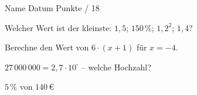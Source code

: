 \documentclass[11pt]{article}
\begin{document}
{}
\par\vspace{2pt}\noindent Name \underline{\hspace{7cm}}\hfill Datum \underline{\hspace{3cm}}\hfill Punkte \underline{\hspace{1.2cm}} / 18\par\vspace{6pt}
\small

\noindent\begin{minipage}[t]{0.485\linewidth}\raggedright
\begin{aufgabe}{Welcher Wert ist der kleinste: $1{,}5$; $150\,\%$; $1{,}2^2$; $1{,}4$? \leerfeld}
\end{aufgabe}
\end{minipage}\hfill\begin{minipage}[t]{0.485\linewidth}\raggedright
\begin{aufgabe}{Berechne den Wert von $6 \cdot (x + 1)$ für $x = -4$. \leerfeld}
\end{aufgabe}
\end{minipage}\par

\noindent\begin{minipage}[t]{0.485\linewidth}\raggedright
\begin{aufgabe}{$27\,000\,000 = 2{,}7 \cdot 10^{\square}$ – welche Hochzahl? \leerfeld}
\end{aufgabe}
\end{minipage}\hfill\begin{minipage}[t]{0.485\linewidth}\raggedright
\begin{aufgabe}{$5\,\%$ von $140\,€$ \leerfeld[€]}
\end{aufgabe}
\end{minipage}\par
\end{document}
